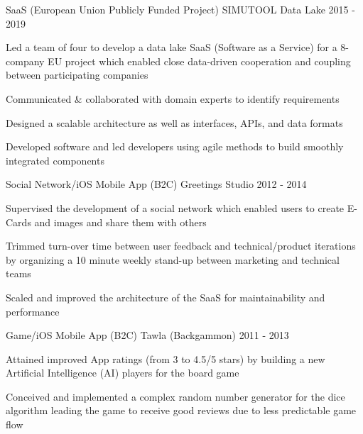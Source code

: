 \begin{cventries}

  \cventry
    {SaaS (European Union Publicly Funded Project)} %
    {SIMUTOOL Data Lake} %
    {} %
    {2015 - 2019} %
    {
          \begin{cvitems} %
			\item {Led a team of four to develop a data lake SaaS (Software as a Service) for a 8-company EU project which enabled close data-driven cooperation and coupling between participating companies} 
			\item {Communicated \& collaborated with domain experts to identify requirements}
			\item {Designed a scalable architecture as well as interfaces, APIs, and data formats}
			\item {Developed software and led developers using agile methods to build smoothly integrated components}
	      \end{cvitems}
    }
    



  \cventry
    {Social Network/iOS Mobile App (B2C)} %
    {Greetings Studio} %
    {} %
    {2012 - 2014} %
    {
          \begin{cvitems} %
				\item {Supervised the development of a social network which enabled users to create E-Cards and images and share them with others}
				\item {Trimmed turn-over time between user feedback and technical/product iterations by organizing a 10 minute weekly stand-up between marketing and technical teams}
				\item {Scaled and improved the architecture of the SaaS for maintainability and performance}
	      \end{cvitems}
    }
    
    


  \cventry
    {Game/iOS Mobile App (B2C)} %
    {Tawla (Backgammon)} %
    {} %
    {2011 - 2013} %
    {
          \begin{cvitems} %
	          	\item {Attained improved App ratings (from 3 to 4.5/5 stars) by building a new Artificial Intelligence (AI) players for the board game}
				\item {Conceived and implemented a complex random number generator for the dice algorithm leading the game to receive good reviews due to less predictable game flow}
	      \end{cvitems}
    }
    

\end{cventries}
